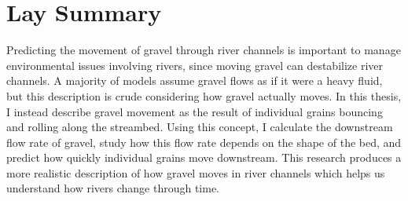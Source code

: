 

\chapter{Lay Summary}

Predicting the movement of gravel through river channels is important to manage environmental issues involving rivers, since moving gravel can destabilize river channels.
A majority of models assume gravel flows as if it were a heavy fluid, but this description is crude considering how gravel actually moves.
In this thesis, I instead describe gravel movement as the result of individual grains bouncing and rolling along the streambed.
Using this concept, I calculate the downstream flow rate of gravel, study how this flow rate depends on the shape of the bed, and predict how quickly individual grains move downstream.
This research produces a more realistic description of how gravel moves in river channels which helps us understand how rivers change through time.

\endinput
The lay or public summary explains the key goals and contributions of
the research\slash{}scholarly work in terms that can be understood by the
general public. It must not exceed 150 words in length.
